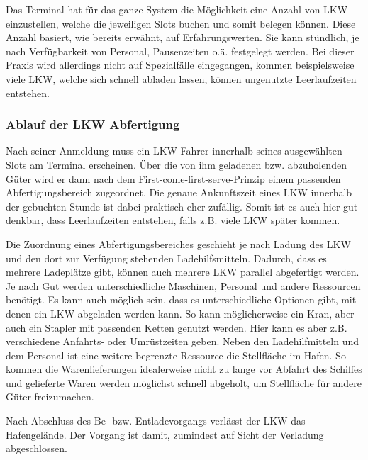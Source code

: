 Das Terminal hat für das ganze System die Möglichkeit eine Anzahl von LKW einzustellen, welche die jeweiligen Slots buchen und somit belegen können. Diese Anzahl basiert, wie bereits erwähnt, auf Erfahrungswerten. Sie kann stündlich, je nach Verfügbarkeit von Personal, Pausenzeiten o.ä. festgelegt werden. Bei dieser Praxis wird allerdings nicht auf Spezialfälle eingegangen, kommen beispielsweise viele LKW, welche sich schnell abladen lassen, können ungenutzte Leerlaufzeiten entstehen.


\subsubsection{Ablauf der LKW Abfertigung}
\label{sec:analyseAbfertigung}


Nach seiner Anmeldung muss ein LKW Fahrer innerhalb seines ausgewählten Slots am Terminal erscheinen. Über die von ihm geladenen bzw. abzuholenden Güter wird er dann nach dem \glqq{}First-come-first-serve\grqq{}-Prinzip einem passenden Abfertigungsbereich zugeordnet. Die genaue Ankunftszeit eines LKW innerhalb der gebuchten Stunde ist dabei praktisch eher zufällig. Somit ist es auch hier gut denkbar, dass Leerlaufzeiten entstehen, falls z.B. viele LKW später kommen.

Die Zuordnung eines Abfertigungsbereiches geschieht je nach Ladung des LKW und den dort zur Verfügung stehenden Ladehilfsmitteln. Dadurch, dass es mehrere Ladeplätze gibt, können auch mehrere LKW parallel abgefertigt werden. Je nach Gut werden unterschiedliche Maschinen, Personal und andere Ressourcen benötigt. Es kann auch möglich sein, dass es unterschiedliche Optionen gibt, mit denen ein LKW abgeladen werden kann. So kann möglicherweise ein Kran, aber auch ein Stapler mit passenden Ketten genutzt werden. Hier kann es aber z.B. verschiedene Anfahrts- oder Umrüstzeiten geben. Neben den Ladehilfmitteln und dem Personal ist eine weitere begrenzte Ressource die Stellfläche im Hafen. So kommen die Warenlieferungen idealerweise nicht zu lange vor Abfahrt des Schiffes und gelieferte Waren werden möglichst schnell abgeholt, um Stellfläche für andere Güter freizumachen.

Nach Abschluss des Be- bzw. Entladevorgangs verlässt der LKW das Hafengelände. Der Vorgang ist damit, zumindest auf Sicht der Verladung abgeschlossen.

